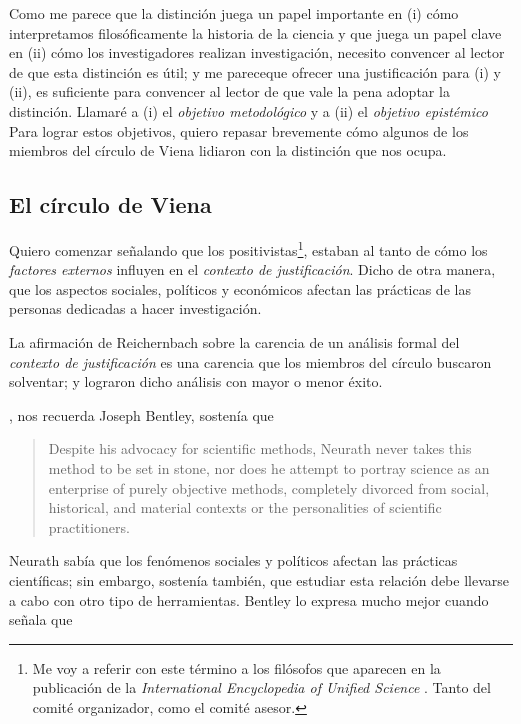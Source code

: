 Como me parece que la distinción juega un papel importante en (i) cómo interpretamos filosóficamente la historia de la ciencia y que juega un papel clave en (ii) cómo los investigadores realizan investigación, necesito convencer al lector de que esta distinción es útil; 
y me pareceque ofrecer una justificación para (i) y (ii), es suficiente para convencer al lector de que vale la pena adoptar la distinción.
Llamaré a (i) el \emph{objetivo metodológico} y a (ii) el \emph{objetivo epistémico}
Para lograr estos objetivos, quiero repasar brevemente cómo algunos de los miembros del círculo de Viena lidiaron con la distinción que nos ocupa.


\subsection{El círculo de Viena}

\noindent Quiero comenzar señalando que los positivistas\footnote{
	Me voy a referir con este término a los filósofos que aparecen en la publicación de la \emph{International Encyclopedia of Unified Science} \parencite{Carnap1938-CARFOL-10}.
	Tanto del comité organizador, como el comité asesor.
	}, 
estaban al tanto de cómo los \emph{factores externos} influyen en el \emph{contexto de justificación}.
Dicho de otra manera, que los aspectos sociales, políticos y económicos afectan las prácticas de las personas dedicadas a hacer investigación.

La afirmación de Reichernbach sobre la carencia de un análisis formal del \emph{contexto de justificación} es una carencia que los miembros del círculo buscaron solventar; y lograron dicho análisis con mayor o menor éxito.

, nos recuerda Joseph Bentley, sostenía que

\begin{quote}
	Despite his advocacy for scientific methods, Neurath never takes this method to be set in stone, nor does he attempt to portray science as an enterprise of purely objective methods, completely divorced from social, historical, and material contexts or the personalities of scientific practitioners. \parencite[p.~41]{Bentley2023}
\end{quote}

Neurath sabía que los fenómenos sociales y políticos afectan las prácticas científicas; sin embargo, sostenía también, que estudiar esta relación debe llevarse a cabo con otro tipo de herramientas.
Bentley lo expresa mucho mejor cuando señala que  \parencite[p.~62]{Bentley2023}

